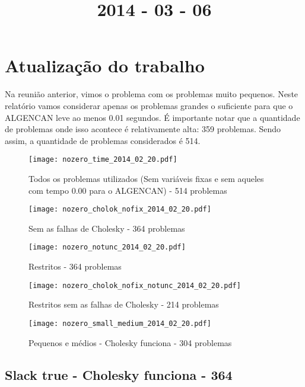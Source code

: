 \documentclass{article}
\title{2014 - 03 - 06}
\author{}
\date{}
\begin{document}
\maketitle
\section{Atualização do trabalho}

Na reunião anterior, vimos o problema com os problemas muito pequenos. Neste
relatório vamos considerar apenas os problemas grandes o suficiente para que o
ALGENCAN leve ao menos 0.01 segundos.
É importante notar que a quantidade de problemas onde isso acontece é
relativamente alta: 359 problemas.
Sendo assim, a quantidade de problemas considerados é 514.

\begin{figure}[H]
  \centering
  \texttt{[image: nozero\_time\_2014\_02\_20.pdf]}
  \caption{Todos os problemas utilizados (Sem variáveis fixas e sem aqueles
  com tempo 0.00 para o ALGENCAN) - 514 problemas}
  \label{fig:nozero_time}
\end{figure}
\begin{figure}[H]
  \centering
  \texttt{[image: nozero\_cholok\_nofix\_2014\_02\_20.pdf]}
  \caption{Sem as falhas de Cholesky - 364 problemas}
\end{figure}
\begin{figure}[H]
  \centering
  \texttt{[image: nozero\_notunc\_2014\_02\_20.pdf]}
  \caption{Restritos - 364 problemas}
\end{figure}
\begin{figure}[H]
  \centering
  \texttt{[image: nozero\_cholok\_nofix\_notunc\_2014\_02\_20.pdf]}
  \caption{Restritos sem as falhas de Cholesky - 214 problemas}
\end{figure}
\begin{figure}[H]
  \centering
  \texttt{[image: nozero\_small\_medium\_2014\_02\_20.pdf]}
  \caption{Pequenos e médios - Cholesky funciona - 304 problemas}
\end{figure}

\newpage
\subsection{Slack true - Cholesky funciona - 364}
\end{document}

